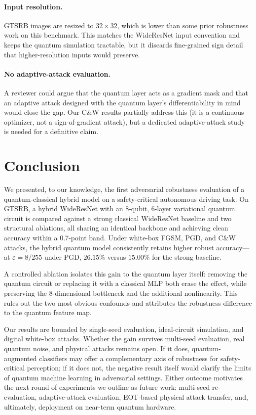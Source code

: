 \documentclass[11pt]{article}
\newcommand{\eps}{\varepsilon}
\begin{document}
\paragraph{Input resolution.}
GTSRB images are resized to $32\times32$, which is lower than some
prior robustness work on this benchmark. This matches the WideResNet
input convention and keeps the quantum simulation tractable, but it
discards fine-grained sign detail that higher-resolution inputs would
preserve.

\paragraph{No adaptive-attack evaluation.}
A reviewer could argue that the quantum layer acts as a gradient mask
and that an adaptive attack designed with the quantum layer's
differentiability in mind would close the gap. Our C\&W results partially
address this (it is a continuous optimizer, not a sign-of-gradient
attack), but a dedicated adaptive-attack study~\cite{tramer2020adaptive}
is needed for a definitive claim.

\section{Conclusion}
\label{sec:conclusion}

We presented, to our knowledge, the first adversarial robustness
evaluation of a quantum-classical hybrid model on a safety-critical
autonomous driving task. On GTSRB, a hybrid WideResNet with an 8-qubit,
6-layer variational quantum circuit is compared against a strong
classical WideResNet baseline and two structural ablations, all sharing
an identical backbone and achieving clean accuracy within a 0.7-point
band. Under white-box FGSM, PGD, and C\&W attacks, the hybrid quantum
model consistently retains higher robust accuracy---at $\eps=8/255$
under PGD, $26.15\%$ versus $15.00\%$ for the strong baseline.

A controlled ablation isolates this gain to the quantum layer itself:
removing the quantum circuit or replacing it with a classical MLP both
erase the effect, while preserving the 8-dimensional bottleneck and the
additional nonlinearity. This rules out the two most obvious confounds
and attributes the robustness difference to the quantum feature map.

Our results are bounded by single-seed evaluation, ideal-circuit
simulation, and digital white-box attacks. Whether the gain survives
multi-seed evaluation, real quantum noise, and physical attacks remains
open. If it does, quantum-augmented classifiers may offer a
complementary axis of robustness for safety-critical perception; if it
does not, the negative result itself would clarify the limits of quantum
machine learning in adversarial settings. Either outcome motivates the
next round of experiments we outline as future work: multi-seed
re-evaluation, adaptive-attack evaluation, EOT-based physical attack
transfer, and, ultimately, deployment on near-term quantum hardware.



\end{document}

